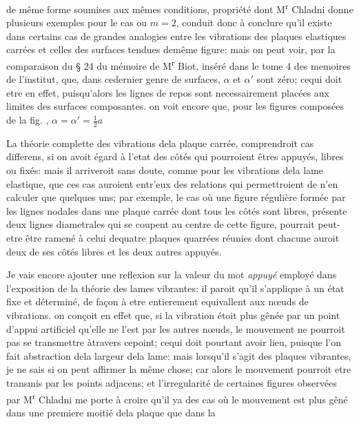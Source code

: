 \documentclass[11pt,a4paper]{article}
\begin{document}

de même forme soumises aux mêmes conditions, propriété dont M\textsuperscript{r} Chladni donne
plusieurs exemples pour le cas ou $m = 2$, conduit donc à conclure qu'il existe dans certains
cas de grandes analogies entre les vibrations des plaques elastiques carrées et celles des
surfaces tendues demême figure: mais on peut voir, par la comparaison du § 24 du
mémoire de M\textsuperscript{r} Biot, inséré dans le tome 4 des memoires de l'institut, que, dans cedernier
genre de surfaces, $\alpha$ et $\alpha'$ sont zéro; cequi doit etre en effet, puisqu'alors les lignes
de repos sont necessairement placées aux limites des surfaces composantes. on voit
encore que, pour les figures composées de la fig. , $\alpha = \alpha' = \frac{1}{2}a$

La théorie complette des vibrations dela plaque carrée, comprendroit 
cas differens, si on avoit égard à l'etat des côtés qui pourroient êtres appuyés,
libres ou fixés: mais il arriveroit sans doute, comme pour les vibrations 
dela lame elastique, que ces cas auroient entr'eux des relations qui permettroient
de n'en calculer que quelques uns; par exemple, le cas où une figure régulière
formée par les lignes nodales dans une plaque carrée dont tous les côtés sont libres,
présente deux lignes diametrales qui se coupent au centre de cette figure,
pourrait peut-etre être ramené à celui dequatre plaques quarrées réunies dont
chacune auroit deux de ses côtés libres et les deux autres appuyés.

Je vais encore ajouter une reflexion sur la valeur du mot \emph{appuyé} employé dans
l'exposition de la théorie des lames vibrantes: il paroit qu'il s'applique à un état
fixe et déterminé, de façon à etre entierement equivallent aux nœuds de vibrations.
on conçoit en effet que, si la vibration étoit plus gênée par un point d'appui
artificiel qu'elle ne l'est par les autres nœuds, le mouvement ne pourroit pas
se transmettre àtravers cepoint; cequi doit pourtant avoir lieu, puisque l'on fait
abstraction dela largeur dela lame: mais lorsqu'il s'agit des plaques vibrantes,
je ne sais si on peut affirmer la même chose; car alors le mouvement pourroit
etre transmis par les points adjacens; et l'irregularité de certaines figures observées par
M\textsuperscript{r} Chladni me porte à croire qu'il ya des cas où le mouvement est plus gêné dans une premiere
moitié dela plaque que dans la
\end{document}
